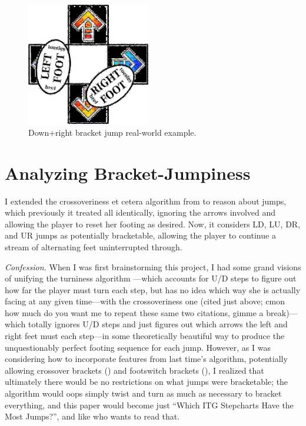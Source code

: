 \documentclass[10pt]{sigplanconf}
\begin{document}
\begin{figure}[h]
	\begin{center}
		\includegraphics[width=0.48\textwidth]{how-2-bracket.jpg}
	\end{center}
	\caption{Down+right bracket jump real-world example.}
	\label{fig:how-2-bracket}
\end{figure}


\section{Analyzing Bracket-Jumpiness}
\label{sec:analyzing}

I extended the crossoveriness et cetera algorithm from \cite{crossoveriness} to reason about jumps,
which previously it treated all identically,
ignoring the arrows involved and allowing the player to reset her footing as desired.
Now, it considers LD, LU, DR, and UR jumps as potentially bracketable,
allowing the player to continue a stream of alternating feet uninterrupted through.

\textit{Confession.}
When I was first brainstorming this project,
I had some grand visions of unifying the turniness algorithm \cite{turniness}---which
accounts for U/D steps to figure out how far the player must turn each step,
but has no idea which way she is actually facing at any given time---with
the crossoveriness one
(cited just above; cmon how much do you want me to repeat these same two citations, gimme a break)---which
totally ignores U/D steps and just figures out which arrows the left and right feet must each step---in
some theoretically beautiful way to produce the unquestionably perfect footing sequence for each jump.
%
However, as I was considering how to incorporate features from last time's algorithm,
potentially allowing crossover brackets ()
and footswitch brackets (),
I realized that ultimately there would be no restrictions on what jumps were bracketable;
the algorithm would oops simply twist and turn as much as necessary to bracket everything,
and this paper would become just ``Which ITG Stepcharts Have the Most Jumps?'', and like who wants to read that.
\end{document}
